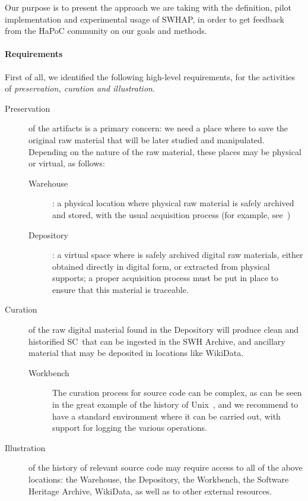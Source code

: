 \documentclass[a4paper]{article}
\newcommand{\sourcecode}{SC}
\begin{document}
\noindent
Our purpose is to present the approach we are taking with the definition, pilot implementation and experimental usage of SWHAP, in order to get feedback from the HaPoC community on our goals and methods. 

\paragraph{Requirements}
First of all, we identified the following high-level requirements, for the activities of \emph{preservation, curation and illustration}.



\begin{description}
	\item[Preservation] of the artifacts is a primary concern: we need a place where to save the original raw material that will be later studied and manipulated. Depending on the nature of the raw material, these places may be physical or virtual, as follows:
	\begin{description}
		\item[Warehouse]: a physical location where physical raw material is safely archived and stored, with the usual acquisition process (for example, see~\cite{Spectrum})
		\item[Depository]: a virtual space where is safely archived digital raw materials, either obtained directly in digital form, or extracted from physical supports; a proper acquisition process must be put in place to ensure that this material is traceable.
        \end{description}
      \item[Curation] of the raw digital material found in the Depository will produce clean and historified \sourcecode~that can be ingested in the SWH Archive, and ancillary material that may be deposited in locations like WikiData.
        \begin{description}
          \item[Workbench] The curation process for source code can be complex, as can be seen in the great example of the history of Unix~\cite{Spi16g}, and we recommend to have a standard environment where it can be carried out, with support for logging the various operations.
        \end{description}
      \item[Illustration] of the history of relevant source code may require access to all of the above locations: the Warehouse, the Depository, the Workbench, the Software Heritage Archive, WikiData, as well as to other external resources.
\end{description}
\end{document}
